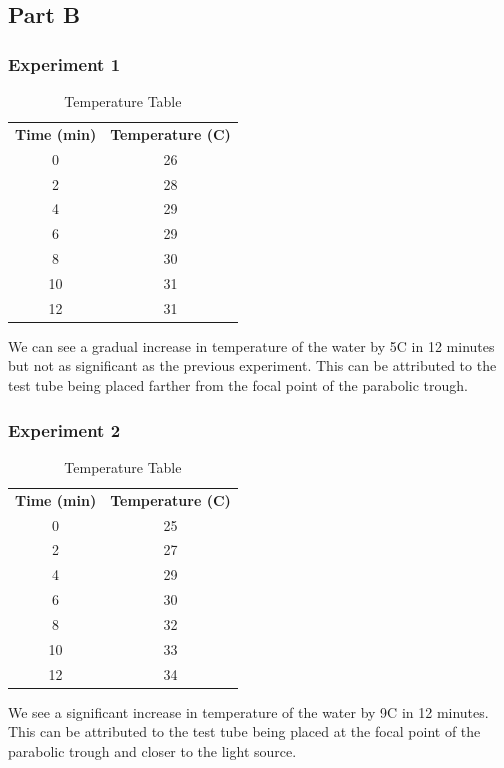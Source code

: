 \documentclass[a4paper, 12pt, english]{article}
\begin{document}
\subsection{Part B}
\subsubsection{Experiment 1}
\begin{table}[H]
	\caption{\label{tab:Table 3} Temperature Table}
	\centering
	\begin{tabular}{c c}
		\toprule
		\textbf{Time (min)}
		   & \textbf{Temperature (\degree C)} \\
		\cmidrule[0.4pt](r{0.125em}){1-1}%
		\cmidrule[0.4pt](lr{0.125em}){2-2}%
		0  & 26                               \\
		2  & 28                               \\
		4  & 29                               \\
		6  & 29                               \\
		8  & 30                               \\
		10 & 31                               \\
		12 & 31                               \\
		\bottomrule
	\end{tabular}
\end{table}
We can see a gradual increase in temperature of the water by 5\degree C in 12
minutes but not as significant as the previous experiment. This can be attributed
to the test tube being placed farther from the focal point of the parabolic trough.

\subsubsection{Experiment 2}
\begin{table}[H]
	\caption{\label{tab:Table 3} Temperature Table}
	\centering
	\begin{tabular}{c c}
		\toprule
		\textbf{Time (min)}
		   & \textbf{Temperature (\degree C)} \\
		\cmidrule[0.4pt](r{0.125em}){1-1}%
		\cmidrule[0.4pt](lr{0.125em}){2-2}%
		0  & 25                               \\
		2  & 27                               \\
		4  & 29                               \\
		6  & 30                               \\
		8  & 32                               \\
		10 & 33                               \\
		12 & 34                               \\
		\bottomrule
	\end{tabular}
\end{table}
We see a significant increase in temperature of the water by 9\degree C in 12
minutes. This can be attributed to the test tube being placed at the focal point
of the parabolic trough and closer to the light source.
\end{document}
